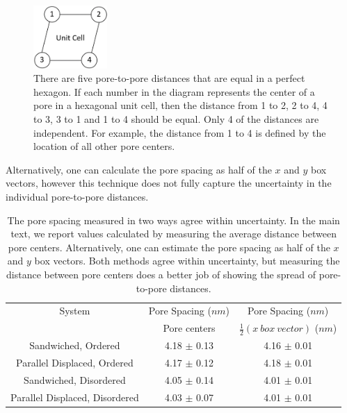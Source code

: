 \documentclass{article}
\begin{document}
  \begin{figure}[!htb]
	\centering
	\includegraphics[width=0.25\textwidth]{p2p_diagram.png}
	\caption{There are five pore-to-pore distances that are equal in a perfect
		hexagon. If each number in the diagram represents the center of a
		pore in a hexagonal unit cell, then the distance from 1 to 2, 2 to 4, 
		4 to 3, 3 to 1 and 1 to 4 should be equal. Only 4 of the distances
		are independent. For example, the distance from 1 to 4 is defined by
		the location of all other pore centers.}
	\label{fig:p2p_diagram}  %
  \end{figure}
  
  Alternatively, one can calculate the pore spacing as half of the $x$ and $y$
  box vectors, however this technique does not fully capture the uncertainty
  in the individual pore-to-pore distances. 
  
  \begin{table}[h]
  \centering
  \begin{tabular}{ccc}
  \toprule
  System                         & Pore Spacing ($nm$) & Pore Spacing ($nm$)              \\
                                 & Pore centers        & $\frac{1}{2}(x\ box\ vector)$ ($nm$) \\ 
  \midrule
  Sandwiched, Ordered            & 4.18 $\pm$ 0.13     & 4.16 $\pm$ 0.01                  \\
  Parallel Displaced, Ordered    & 4.17 $\pm$ 0.12     & 4.18 $\pm$ 0.01                  \\
  Sandwiched, Disordered         & 4.05 $\pm$ 0.14     & 4.01 $\pm$ 0.01                  \\
  Parallel Displaced, Disordered & 4.03 $\pm$ 0.07     & 4.01 $\pm$ 0.01                  \\
  \bottomrule
  \end{tabular}
  \caption{The pore spacing measured in two ways agree within uncertainty. In the main
  text, we report values calculated by measuring the average distance between pore centers. 
  Alternatively, one can estimate the pore spacing as half of the $x$ and $y$ box vectors.
  Both methods agree within uncertainty, but measuring the distance between pore centers
  does a better job of showing the spread of pore-to-pore distances.}~\label{table:p2p}
  \end{table}
\end{document}
